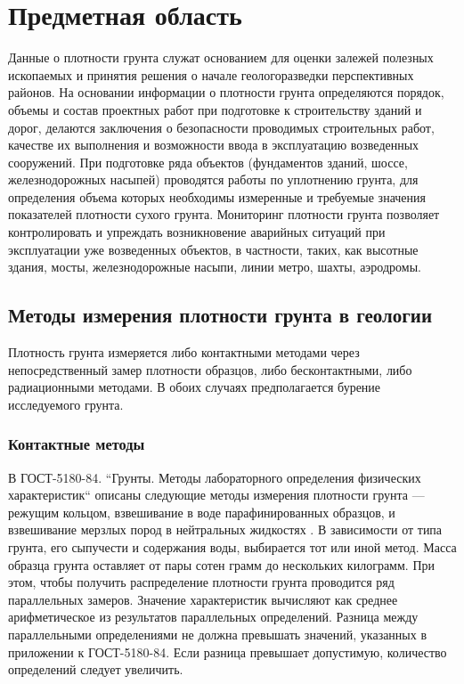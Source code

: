\documentclass[a4paper,10pt]{article}
\begin{document}
\section{Предметная область}
Данные о плотности грунта служат основанием для оценки залежей полезных ископаемых 
и принятия решения о начале геологоразведки перспективных районов. На основании  информации о плотности грунта 
определяются порядок, объемы и состав проектных работ при подготовке к строительству зданий и дорог, делаются заключения о безопасности проводимых 
строительных работ, качестве их выполнения и возможности ввода в эксплуатацию возведенных сооружений. При подготовке ряда объектов 
(фундаментов зданий, шоссе, железнодорожных насыпей) проводятся 
работы по уплотнению грунта, для определения объема которых необходимы измеренные и требуемые значения показателей плотности сухого грунта.
Мониторинг плотности грунта позволяет контролировать и упреждать возникновение аварийных ситуаций при эксплуатации уже возведенных объектов, 
в частности, таких, как высотные здания, мосты, железнодорожные насыпи, линии метро, шахты, аэродромы.


\subsection{Методы измерения плотности грунта в геологии}

Плотность грунта измеряется либо контактными методами через непосредственный замер плотности образцов, 
либо бесконтактными, либо радиационными методами. 
В обоих случаях предполагается бурение исследуемого грунта. 

\subsubsection{Контактные методы}

В ГОСТ-5180-84. ``Грунты. Методы лабораторного определения физических характеристик`` описаны следующие 
методы измерения плотности грунта --- режущим кольцом, взвешивание в воде парафинированных образцов, и 
взвешивание мерзлых пород в нейтральных жидкостях . В зависимости от типа грунта, его сыпучести и содержания воды,
выбирается тот или иной метод. Масса образца грунта оставляет от пары сотен грамм до нескольких килограмм. При этом, чтобы получить 
распределение плотности грунта проводится ряд параллельных замеров. Значение характеристик вычисляют как 
среднее арифметическое из результатов параллельных определений. 
Разница между параллельными определениями не должна превышать значений, указанных в приложении к ГОСТ-5180-84. 
Если разница превышает допустимую, количество определений следует увеличить.
\end{document}
